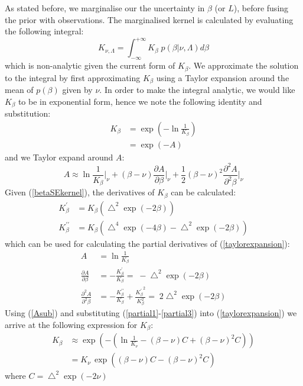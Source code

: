 \documentclass{article}
\begin{document}
As stated before, we marginalise our the uncertainty in $\beta$ (or $L$), before fusing the prior with observations. The marginalised kernel is calculated by evaluating the following integral:
\begin{equation} \label{kernelmargint}
K_{\nu,\Lambda} = \int_{-\infty}^{+\infty} K_\beta \; p(\beta|\nu,\Lambda) d\beta
\end{equation}
which is non-analytic given the current form of $K_\beta$. We approximate the solution to the integral by first approximating $K_\beta$ using a Taylor expansion around the mean of $p(\beta)$ given by $\nu$. In order to make the integral analytic, we would like $K_\beta$ to be in exponential form, hence we note the following identity and substitution:
\begin{align}
K_\beta &= \exp \left( -\ln \frac{1}{K_\beta} \right) \nonumber\\ 
&= \exp \left( -A \right) \label{Asub}
\end{align}
and we Taylor expand around $A$:
\begin{equation} \label{taylorexpansion}
A \approx \ln \frac{1}{K_{\beta}}\bigg|_{\nu} + (\beta-\nu) \frac{\partial{A}}{\partial{\beta}}\bigg|_{\nu} + \frac{1}{2}(\beta-\nu)^2 \frac{\partial^2{A}}{\partial^2{\beta}}\bigg|_{\nu}
\end{equation}
Given (\ref{betaSEkernel}), the derivatives of $K_\beta$ can be calculated:
\begin{align*}
K^\prime_\beta &= K_\beta \left( \bigtriangleup^2 \exp(-2\beta)  \right) \\ 
K^{\prime\prime}_\beta &= K_\beta \left( \bigtriangleup^4 \exp(-4\beta) -  \bigtriangleup^2 \exp(-2\beta) \right)
\end{align*}
which can be used for calculating the partial derivatives of (\ref{taylorexpansion}):
\begin{align}
A &= \ln \frac{1}{K_\beta} \label{partial1}\\
\frac{\partial{A}}{\partial{\beta}} &= -\frac{K^\prime_\beta}{K_\beta} = \; -\bigtriangleup^2 \exp(-2\beta) \label{partial2}\\
\frac{\partial^2{A}}{\partial^2{\beta}} &= -\frac{K^{\prime\prime}_\beta}{K_\beta} + \frac{{K^\prime_\beta}^2}{K_\beta^2} = \; 2 \bigtriangleup^2 \exp(-2\beta) \label{partial3}
\end{align}
Using (\ref{Asub}) and substituting (\ref{partial1}-\ref{partial3}) into (\ref{taylorexpansion}) we arrive at the following expression for $K_\beta$:
\begin{align}
K_\beta &\approx \exp \left(-\left( \ln \frac{1}{K_{\nu}} - (\beta-\nu) C + (\beta-\nu)^2 C \right)   \right) \nonumber\\
&= K_{\nu} \, \exp \left( (\beta-\nu) C - (\beta-\nu)^2 C \right) \label{approxkernel}
\end{align}
where $C = \bigtriangleup^2 \exp(-2\nu)$
\end{document}
